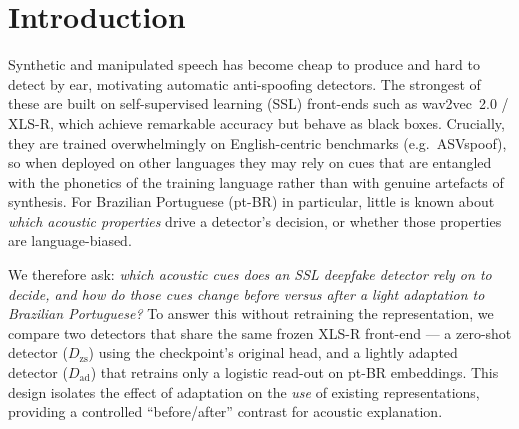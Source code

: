 \documentclass[sigconf]{acmart}
\begin{document}

\maketitle

\section{Introduction}
Synthetic and manipulated speech has become cheap to produce and hard to detect by
ear, motivating automatic anti-spoofing detectors. The strongest of these are built
on self-supervised learning (SSL) front-ends such as wav2vec~2.0 / XLS-R, which
achieve remarkable accuracy but behave as black boxes. Crucially, they are trained
overwhelmingly on English-centric benchmarks (e.g.\ ASVspoof), so when deployed on
other languages they may rely on cues that are entangled with the phonetics of the
training language rather than with genuine artefacts of synthesis. For Brazilian
Portuguese (pt-BR) in particular, little is known about \emph{which acoustic
properties} drive a detector's decision, or whether those properties are
language-biased.

We therefore ask: \emph{which acoustic cues does an SSL deepfake detector rely on
to decide, and how do those cues change before versus after a light adaptation to
Brazilian Portuguese?} To answer this without retraining the representation, we
compare two detectors that share the same frozen XLS-R front-end --- a zero-shot
detector ($D_\mathrm{zs}$) using the checkpoint's original head, and a lightly
adapted detector ($D_\mathrm{ad}$) that retrains only a logistic read-out on pt-BR
embeddings. This design isolates the effect of adaptation on the \emph{use} of
existing representations, providing a controlled ``before/after'' contrast for
acoustic explanation.
\end{document}
